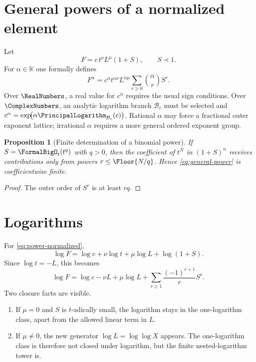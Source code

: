 \documentclass[11pt,oneside]{book}
\newtheorem{proposition}[theorem]{Proposition}
\theoremstyle{definition}
\theoremstyle{remark}
\newcommand{\K}{\mathbb K}
\newcommand{\precdom}{\prec}
\newcommand{\LogarithmOnBranch}[2]{%
  \PrincipalLogarithm_{#1}\!\left(#2\right)%
}
\begin{document}
\section{General powers of a normalized element}
Let
\begin{equation}\label{eq:power-normalized}
 F=c\,t^\nu L^\mu(1+S),
 \qquad S\precdom1.
\end{equation}
For $\alpha\in\K$ one formally defines
\begin{equation}\label{eq:general-power}
 F^\alpha=c^\alpha t^{\alpha\nu}L^{\alpha\mu}
 \sum_{r\ge0}\binom{\alpha}{r}S^r.
\end{equation}
Over $\RealNumbers$, a real value for $c^\alpha$ requires the usual sign conditions.
Over $\ComplexNumbers$, an analytic logarithm branch $\mathcal B_c$ must be
selected and
$c^\alpha=\exp\!\bigl(\alpha\LogarithmOnBranch{\mathcal B_c}{c}\bigr)$.
Rational $\alpha$ may
force a fractional outer exponent lattice; irrational $\alpha$ requires a
more general ordered exponent group.

\begin{proposition}[Finite determination of a binomial power]
If $S=\FormalBigO_t(t^q)$ with $q>0$, then the coefficient of $t^N$ in
$(1+S)^\alpha$ receives contributions only from powers
$r\le\Floor{N/q}$.  Hence \eqref{eq:general-power} is
coefficientwise finite.
\end{proposition}
\begin{proof}
The outer order of $S^r$ is at least $rq$.
\end{proof}

\section{Logarithms}
For \eqref{eq:power-normalized},
\begin{equation}\label{eq:log-normalized}
 \log F=\log c+\nu\log t+\mu\log L+\log(1+S).
\end{equation}
Since $\log t=-L$, this becomes
\begin{equation}\label{eq:log-normalized-expanded}
 \log F=\log c-\nu L+\mu\log L
 +\sum_{r\ge1}\frac{(-1)^{r+1}}rS^r.
\end{equation}
Two closure facts are visible.
\begin{enumerate}
\item If $\mu=0$ and $S$ is $t$-adically small, the logarithm stays in the
      one-logarithm class, apart from the allowed linear term in $L$.
\item If $\mu\ne0$, the new generator $\log L=\log\log X$ appears.  The
      one-logarithm class is therefore not closed under logarithm, but the
      finite nested-logarithm tower is.
\end{enumerate}
\end{document}
